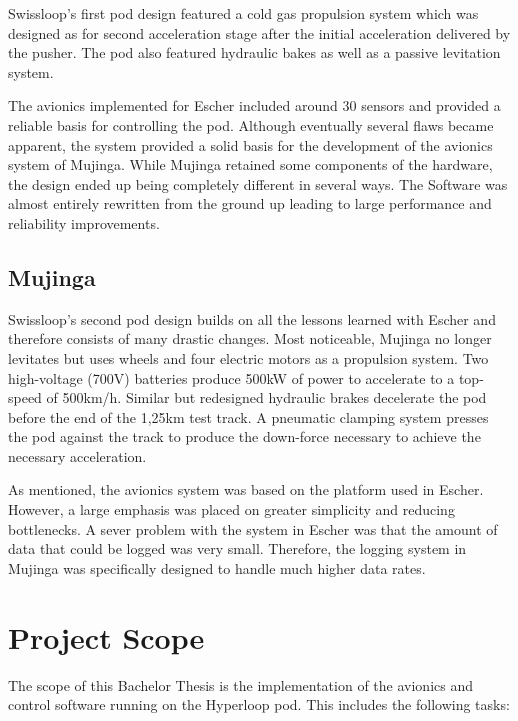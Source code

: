 Swissloop's first pod design featured a cold gas propulsion system which was designed as for second acceleration stage after the initial acceleration delivered by the pusher. The pod also featured hydraulic bakes as well as a passive levitation system.

The avionics implemented for Escher included around 30 sensors and provided a reliable basis for controlling the pod. Although eventually several flaws became apparent, the system provided a solid basis for the development of the avionics system of Mujinga. While Mujinga retained some components of the hardware, the design ended up being completely different in several ways. The Software was almost entirely rewritten from the ground up leading to large performance and reliability improvements.


\subsection{Mujinga}

Swissloop's second pod design builds on all the lessons learned with Escher and therefore consists of many drastic changes. Most noticeable, Mujinga no longer levitates but uses wheels and four electric motors as a propulsion system. Two high-voltage (700V) batteries produce 500kW of power to accelerate to a top-speed of 500km/h. Similar but redesigned hydraulic brakes decelerate the pod before the end of the 1,25km test track. A pneumatic clamping system presses the pod against the track to produce the down-force necessary to achieve the necessary acceleration.

As mentioned, the avionics system was based on the platform used in Escher. However, a large emphasis was placed on greater simplicity and reducing bottlenecks. A sever problem with the system in Escher was that the amount of data that could be logged was very small. Therefore, the logging system in Mujinga was specifically designed to handle much higher data rates.


\section{Project Scope}

The scope of this Bachelor Thesis is the implementation of the avionics and control software running on the Hyperloop pod. This includes the following tasks:

